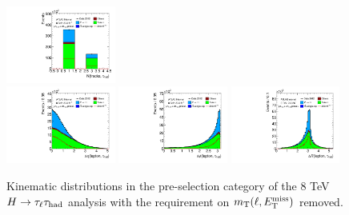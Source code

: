 \begin{figure}[tp]
  \includegraphics[width=0.32\textwidth]{figures/presel/tau-numTrack} \\
  \includegraphics[width=0.32\textwidth]{figures/presel/taulep-deta}
  \includegraphics[width=0.32\textwidth]{figures/presel/taulep-dphi}
  \includegraphics[width=0.32\textwidth]{figures/presel/taulep-dR} \\
  \caption{Kinematic distributions in the pre-selection category of the 8 TeV $H\rightarrow\tau_\ell\tau_\text{had}$ analysis with the requirement on $m_\text{T}(\ell, E_{\mathrm{T}}^{\mathrm{miss}})$ removed.}
  \label{fig:stategy-presel-1}
\end{figure}

\clearpage

